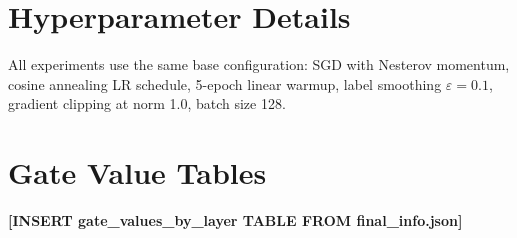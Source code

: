 \documentclass{article} %
\begin{document}



\appendix
\section{Hyperparameter Details}
All experiments use the same base configuration: SGD with Nesterov momentum, cosine annealing LR schedule, 5-epoch linear warmup, label smoothing $\varepsilon = 0.1$, gradient clipping at norm 1.0, batch size 128.

\section{Gate Value Tables}
\textbf{[INSERT gate\_values\_by\_layer TABLE FROM final\_info.json]}
\end{document}
